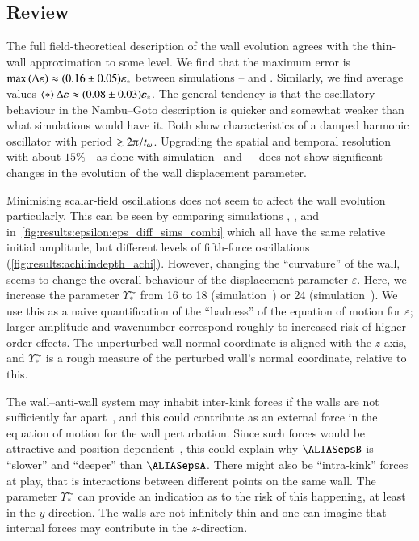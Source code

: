     \subsection{Review}%
        The full field-theoretical description of the wall evolution agrees with the thin-wall approximation to some level. We find that the maximum error is $ \max{(\Delta \varepsilon)} \approx (0.16 \pm 0.05)\varepsilon_\ast$ between simulations -- and . Similarly, we find average values $\left\langle{*}\right\rangle{\Delta \varepsilon }\approx (0.08 \pm 0.03)\varepsilon_\ast$. The general tendency is that the oscillatory behaviour in the Nambu--Goto description is quicker and somewhat weaker than what simulations would have it. Both show characteristics of a damped harmonic oscillator with period $\gtrsim 2\ppi / t_\omega$. Upgrading the spatial and temporal resolution with about $15\%$---as done with simulation~ and~---does not show significant changes in the evolution of the wall displacement parameter.
        
        Minimising scalar-field oscillations does not seem to affect the wall evolution particularly. This can be seen by comparing simulations , ,  and  in~\cref{fig:results:epsilon:eps_diff_sims_combi} which all have the same relative initial amplitude, but different levels of fifth-force oscillations (\cref{fig:results:achi:indepth_achi}). However, changing the ``curvature'' of the wall, seems to change the overall behaviour of the displacement parameter $\varepsilon$. Here, we increase the parameter $\Upsilon^{\AC}_\ast$ from 16 to 18 (simulation~) or 24 (simulation~). 
        We use this as a naive quantification of the ``badness'' of the equation of motion for $\varepsilon$; larger amplitude and wavenumber correspond roughly to increased risk of higher-order effects. The unperturbed wall normal coordinate is aligned with the $z$-axis, and $\Upsilon^{\AC}_\ast$ is a rough measure of the perturbed wall's normal coordinate, relative to this. 

        The wall--anti-wall system may inhabit inter-kink forces if the walls are not sufficiently far apart~\citep{vachaspatiKinksDomainWalls2006}, and this could contribute as an external force in the equation of motion for the wall perturbation. Since such forces would be attractive and position-dependent~\citep{vachaspatiKinksDomainWalls2006}, this could explain why $\epsB$ is ``slower'' and ``deeper'' than $\epsA$. %
        There might also be ``intra-kink'' forces at play, that is interactions between different points on the same wall. The parameter $\Upsilon^{\AC}_\ast$ can provide an indication as to the risk of this happening, at least in the $y$-direction. The walls are not infinitely thin and one can imagine that internal forces may contribute in the $z$-direction.


